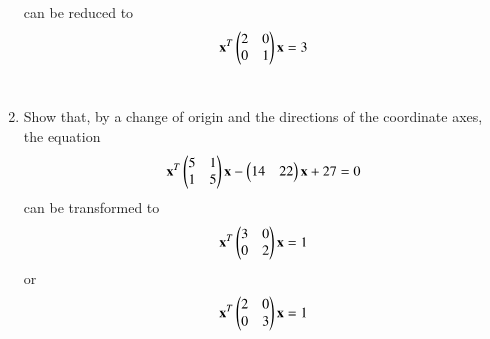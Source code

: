 \begin{enumerate}[label=\arabic*.,ref=\thesubsection.\theenumi]
can be reduced to 
\begin{align}
\mathbf{x}^T\begin{pmatrix}2 & 0\\ 0 & 1\end{pmatrix}\mathbf{x}= 3
\end{align}
\\
\solution

\item Show that, by a change of origin and the directions of the coordinate axes, the equation
\begin{align}
\mathbf{x}^T\begin{pmatrix}5 & 1\\ 1 & 5\end{pmatrix}\mathbf{x}-\begin{pmatrix}14 & 22\end{pmatrix}\mathbf{x}+27= 0
\end{align}
can be transformed to
\begin{align}
\mathbf{x}^T\begin{pmatrix}3 & 0\\ 0 & 2\end{pmatrix}\mathbf{x}= 1
\end{align}
or
\begin{align}
\mathbf{x}^T\begin{pmatrix}2 & 0\\ 0 & 3\end{pmatrix}\mathbf{x}= 1
\end{align}
\end{enumerate}
